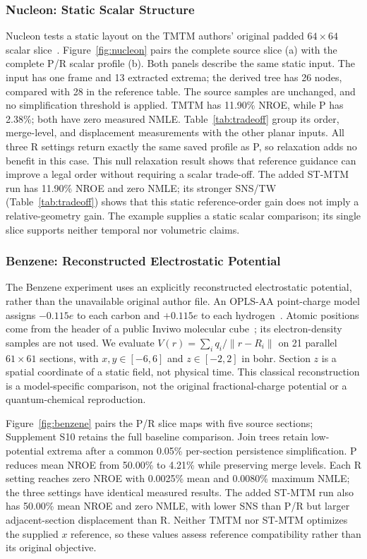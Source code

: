 

\subsubsection{Nucleon: Static Scalar Structure}\label{sec:nucleon}
Nucleon tests a static layout on the TMTM authors' original padded $64\times64$ scalar slice~\cite{Koepp:2023:TMTM}. Figure~\ref{fig:nucleon} pairs the complete source slice (a) with the complete P/R scalar profile (b). Both panels describe the same static input. The input has one frame and 13 extracted extrema; the derived tree has 26 nodes, compared with 28 in the reference table. The source samples are unchanged, and no simplification threshold is applied. TMTM has 11.90\% NROE, while P has 2.38\%; both have zero measured NMLE. Table~\ref{tab:tradeoff} group its order, merge-level, and displacement measurements with the other planar inputs. All three R settings return exactly the same saved profile as P, so relaxation adds no benefit in this case. This null relaxation result shows that reference guidance can improve a legal order without requiring a scalar trade-off. The added ST-MTM run has 11.90\% NROE and zero NMLE; its stronger SNS/TW (Table~\ref{tab:tradeoff}) shows that this static reference-order gain does not imply a relative-geometry gain. The example supplies a static scalar comparison; its single slice supports neither temporal nor volumetric claims.

\subsubsection{Benzene: Reconstructed Electrostatic Potential}\label{sec:benzene}
The Benzene experiment uses an explicitly reconstructed electrostatic potential, rather than the unavailable original author file. An OPLS-AA point-charge model assigns $-0.115e$ to each carbon and $+0.115e$ to each hydrogen~\cite{Jorgensen:2013:BOSS}. Atomic positions come from the header of a public Inviwo molecular cube~\cite{Inviwo:BenzeneGeometry}; its electron-density samples are not used. We evaluate $V(r)=\sum_iq_i/\|r-R_i\|$ on 21 parallel $61\times61$ sections, with $x,y\in[-6,6]$ and $z\in[-2,2]$ in bohr. Section $z$ is a spatial coordinate of a static field, not physical time. This classical reconstruction is a model-specific comparison, not the original fractional-charge potential or a quantum-chemical reproduction.

Figure~\ref{fig:benzene} pairs the P/R slice maps with five source sections; Supplement S10 retains the full baseline comparison. Join trees retain low-potential extrema after a common 0.05\% per-section persistence simplification. P reduces mean NROE from 50.00\% to 4.21\% while preserving merge levels. Each R setting reaches zero NROE with 0.0025\% mean and 0.0080\% maximum NMLE; the three settings have identical measured results. The added ST-MTM run also has 50.00\% mean NROE and zero NMLE, with lower SNS than P/R but larger adjacent-section displacement than R. Neither TMTM nor ST-MTM optimizes the supplied $x$ reference, so these values assess reference compatibility rather than its original objective.

